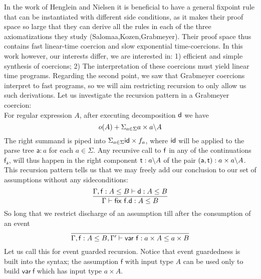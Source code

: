 In the work of Henglein and Nielsen it is beneficial to have a general fixpoint rule that can be instantiated with different side conditions, as it makes their proof space so large that they can derive all the rules in each of the three axiomatizations they study (Salomaa,Kozen,Grabmeyer). Their proof space thus contains fast linear-time coercion and slow exponential time-coercions. In this work however, our interests differ, we are interested in: 1) efficient and simple synthesis of coercions; 2) The interpretation of these coercions must yield linear time programs.
Regarding the second point, we saw that Grabmeyer coercions interpret to fast programs, so we will aim restricting recursion to only allow us such derivations. Let us investigate the recursion pattern in a Grabmeyer coercion:\\
For regular expression $A$, after executing decomposition $\mathsf{d}$ we have 
 \[ o(A) + \Sigma_{a \in \Sigma} a\times a \backslash A \]
 The right summand is piped into $\Sigma_{a \in \Sigma} \mathsf{id}\times f_a$, where $\mathsf{id}$ will be applied to the parse tree $\mathsf{a} : a$ for each $a \in \Sigma$. Any recursive call to $\mathsf{f}$ in any of the continuations $\mathsf{f_a}$, will thus happen in the right component $\mathsf{t} : a \backslash A$ of the pair $(\mathsf{a},\mathsf{t}) : a \times a \backslash A$. 
This recursion pattern tells us that we may freely add our conclusion to our set of assumptions without any sideconditions:
\[\infer{\contains{\Gamma}{\fix ~f.d}{A}{B}}{ \contains{\Gamma, \dslcom{f}: A \leq B}{d}{A}{B}}
\]
So long that we restrict discharge of an assumption till after the consumption of an event
\[\infer{\contains{\Gamma, \mathsf{f} : A \leq B, \Gamma'}{var~f}{a \times A}{a \times B}}{}
\]
Let us call this for event guarded recursion. Notice that event guardedness is built into the syntax; the assumption $\mathsf{f}$ with input type $A$ can be used only to build $\mathsf{var~f}$ which has input type $a \times A$.

